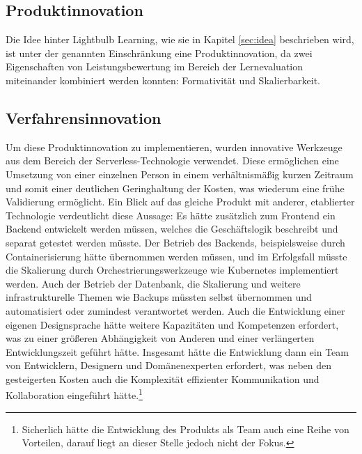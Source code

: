 \subsection{Produktinnovation}
Die Idee hinter Lightbulb Learning, wie sie in Kapitel \ref{sec:idea} beschrieben wird, ist unter der genannten Einschränkung eine Produktinnovation, da zwei Eigenschaften von Leistungsbewertung im Bereich der Lernevaluation miteinander kombiniert werden konnten: Formativität und Skalierbarkeit.
\subsection{Verfahrensinnovation}
Um diese Produktinnovation zu implementieren, wurden innovative Werkzeuge aus dem Bereich der Serverless-Technologie verwendet. Diese ermöglichen eine Umsetzung von einer einzelnen Person in einem verhältnismäßig kurzen Zeitraum und somit einer deutlichen Geringhaltung der Kosten, was wiederum eine frühe Validierung ermöglicht. Ein Blick auf das gleiche Produkt mit anderer, etablierter Technologie verdeutlicht diese Aussage: Es hätte zusätzlich zum Frontend ein Backend entwickelt werden müssen, welches die Geschäftslogik beschreibt und separat getestet werden müsste. Der Betrieb des Backends, beispielsweise durch Containerisierung hätte übernommen werden müssen, und im Erfolgsfall müsste die Skalierung durch Orchestrierungswerkzeuge wie Kubernetes implementiert werden. Auch der Betrieb der Datenbank, die Skalierung und weitere infrastrukturelle Themen wie Backups müssten selbst übernommen und automatisiert oder zumindest verantwortet werden. Auch die Entwicklung einer eigenen Designsprache hätte weitere Kapazitäten und Kompetenzen erfordert, was zu einer größeren Abhängigkeit von Anderen und einer verlängerten Entwicklungszeit geführt hätte. Insgesamt hätte die Entwicklung dann ein Team von Entwicklern, Designern und Domänenexperten erfordert, was neben den gesteigerten Kosten auch die Komplexität effizienter Kommunikation und Kollaboration eingeführt hätte.\footnote{Sicherlich hätte die Entwicklung des Produkts als Team auch eine Reihe von Vorteilen, darauf liegt an dieser Stelle jedoch nicht der Fokus.}